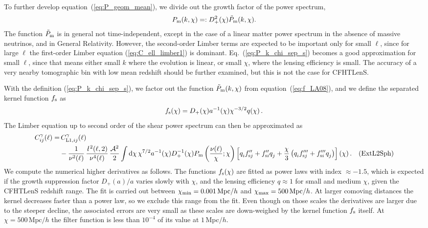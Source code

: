 \documentclass[fleqn,usenatbib]{mnras} %
\newcommand{\ellbar}{\hbox{\it \l}\,}
\newcommand{\pref}{{\cal A}}
\newcommand{\Label}[1]{\quad (\mbox{#1})}
\begin{document}
To further develop equation~(\ref{eq:P_geom_mean}), we divide out the growth factor of
the power spectrum,
%
\begin{equation}
 P_{\rm m}(k, \chi) =: D^2_+(\chi) \tilde P_{\rm m}(k, \chi).
  \label{eq:P_k_chi_sep_s}
\end{equation}
%
The function $\tilde P_{\rm m}$ is in general not time-independent, except
in the case of a linear matter power spectrum in the absence of massive
neutrinos, and in General Relativity. However, the second-order Limber terms
are expected to be important only for small $\ell$, since for large $\ell$ the first-order
Limber equation (\ref{eq:C_ell_limber1}) is dominant. Eq.~(\ref{eq:P_k_chi_sep_s})
becomes a good approximation for small $\ell$, since that means either small
$k$ where the evolution is linear, or small $\chi$, where the lensing
efficiency is small. The accuracy of a very nearby tomographic bin with low
mean redshift should be further examined, but this is not the case for
CFHTLenS.

With the definition (\ref{eq:P_k_chi_sep_s}), we factor out the function
$\tilde P_{\rm m}(k, \chi)$ from equation~(\ref{eq:f_LA08}), and we define the
separated kernel function $f_{\rm s}$ as
%
\begin{equation}
  f_{\rm s}(\chi) = D_+(\chi) a^{-1}(\chi) \chi^{-3/2} q(\chi) \, .
  \label{eq:f_LA08_s}
\end{equation}
%
The Limber equation up to second order of the shear power spectrum can then be approximated as
%
\begin{align}
  C^\gamma_{ij}(\ell) = & \, C^\gamma_{{\rm L1}, ij}(\ell) 
    \nonumber \\
    & - \frac 1 {\nu^2(\ell)} \, \frac{\ellbar^2(\ell, 2)}{\nu^4(\ell)} \,
    \frac{\pref^2}{2}
    \int {\rm d} \chi \, \chi^{7/2} a^{-1}(\chi) D_+^{-1}(\chi) P_{\rm m}\left(\frac{\nu(\ell)}\chi; \chi\right)
    \left[ q^{}_i f^{\prime\prime}_{{\rm s} j} + f^{\prime\prime}_{{\rm s}i} q^{}_j
      + \frac{\chi}{3} \left( q^{}_i f^{\prime\prime\prime}_{{\rm s}j} + f^{\prime\prime\prime}_{{\rm s}i} q^{}_j
      \right)
    \right](\chi) \, . \Label{ExtL2Sph}
  \label{eq:C_ell_limber2_dr_s}
\end{align}
%
We compute the numerical higher derivatives as follows. The functions $f_{\rm
s}(\chi)$ are fitted as power laws with index $\approx -1.5$, which is
expected if the growth suppression factor $D_+(a)/a$ varies slowly with $\chi$,
and the lensing efficiency $q \approx 1$ for small and medium $\chi$, given the
CFHTLenS redshift range. The fit is carried out between $\chi_{\rm min} = 0.001
\, {\rm Mpc}/h$ and $\chi_{\rm max} = 500 \, \mbox{Mpc}/h$. At larger comoving
distances the kernel decreases faster than a power law, so we exclude this
range from the fit. Even though on those scales the derivatives are larger due
to the steeper decline, the associated errors are very small as these scales
are down-weighed by the kernel function $f_{\rm s}$ itself. At $\chi = 500 \,
\mbox{Mpc}/h$ the filter function is less than $10^{-4}$ of its value 
at $1$\,Mpc$/h$.
\end{document}

